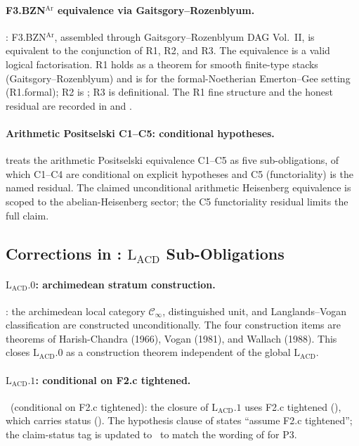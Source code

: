 \paragraph{F3.BZN\({}^{\mathrm{Ar}}\) equivalence via Gaitsgory--Rozenblyum.}
 \ClaimStatusProvedHere:
F3.BZN\({}^{\mathrm{Ar}}\), assembled through Gaitsgory--Rozenblyum
DAG Vol.~II, is equivalent to the conjunction of R1, R2, and R3.
The equivalence is a valid logical factorisation. R1 holds as a
theorem for smooth finite-type stacks (Gaitsgory--Rozenblyum) and
is \ClaimStatusConjectured for the formal-Noetherian Emerton--Gee
setting (R1.formal); R2 is \ClaimStatusNeedsVerification; R3 is
definitional. The R1 fine structure and the honest residual are
recorded in  and
.

\paragraph{Arithmetic Positselski C1--C5: conditional hypotheses.}
 treats the arithmetic Positselski
equivalence C1--C5 as five sub-obligations, of which C1--C4 are
conditional on explicit hypotheses and C5 (functoriality) is the
named residual. The claimed unconditional arithmetic Heisenberg
equivalence is scoped to the abelian-Heisenberg sector; the C5
functoriality residual limits the full claim.

\subsection{Corrections in : \(\mathrm{L}_{\mathrm{ACD}}\) Sub-Obligations}
\label{v4-arith:w3-audit-A:ch31}

\paragraph{\(\mathrm{L}_{\mathrm{ACD}}.0\): archimedean stratum construction.}
 \ClaimStatusProvedHere: the
archimedean local category \(\mathcal{C}_{\infty}\), distinguished
unit, and Langlands--Vogan classification are constructed
unconditionally. The four construction items are theorems of
Harish-Chandra (1966), Vogan (1981), and Wallach (1988). This closes
\(\mathrm{L}_{\mathrm{ACD}}.0\) as a construction theorem independent
of the global \(\mathrm{L}_{\mathrm{ACD}}\).

\paragraph{\(\mathrm{L}_{\mathrm{ACD}}.1\): conditional on F2.c tightened.}
 \ClaimStatusProvedHere\ (conditional
on F2.c tightened): the closure of \(\mathrm{L}_{\mathrm{ACD}}.1\)
uses F2.c tightened (), which
carries status \ClaimStatusNeedsVerification
(). The hypothesis clause of
 states ``assume F2.c tightened'';
the claim-status tag is updated to
\ClaimStatusProvedHereConditional\ to match the wording of
 for P3.

